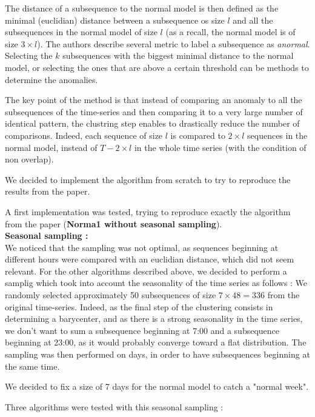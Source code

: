 \documentclass[11pt]{article}
\begin{document}
The distance of a subsequence to the normal model is then defined as the minimal (euclidian) distance between a subsequence os size $l$ and all the subsequences in the normal model of size $l$ (as a recall, the normal model is of size $3 \times l$).
The authors describe several metric to label a subsequence as \textit{anormal}. 
Selecting the $k$ subsequences with the biggest minimal distance to the normal model, or selecting the ones that are above a certain threshold can be methods to determine the anomalies.

The key point of the method is that instead of comparing an anomaly to all the subsequences of the time-series and then comparing it to a very large number of identical pattern, the clustring step enables to drastically reduce the number of comparisons. 
Indeed, each sequence of size $l$ is compared to $2 \times l $ sequences in the normal model, instead of $T - 2 \times l$ in the whole time series (with the condition of non overlap). 


We decided to implement the algorithm from scratch to try to reproduce the results from the paper. 

A first implementation was tested, trying to reproduce exactly the algorithm from the paper (\textbf{Norma1 without seasonal sampling}). \\[0.5cm]

\textbf{Seasonal sampling : }\\
We noticed that the sampling was not optimal, as sequences beginning at different hours were compared with an euclidian distance, which did not seem relevant.
For the other algorithms described above, we decided to perform a samplig which took into account the seasonality of the time series as follows : 
We randomly selected approximately 50 subsequences of size $ 7 \times 48 = 336$ from the original time-series. 
Indeed, as the final step of the clustering consists in determining a barycenter, and as there is a strong seasonality in the time series, we don't want to sum a subsequence beginning at 7:00 and a subsequence beginning at 23:00, as it would probably converge toward a flat distribution. 
The sampling was then performed on days, in order to have subsequences beginning at the same time. 

We decided to fix a size of 7 days for the normal model to catch a "normal week". 

Three algorithms were tested with this seasonal sampling :
\end{document}
